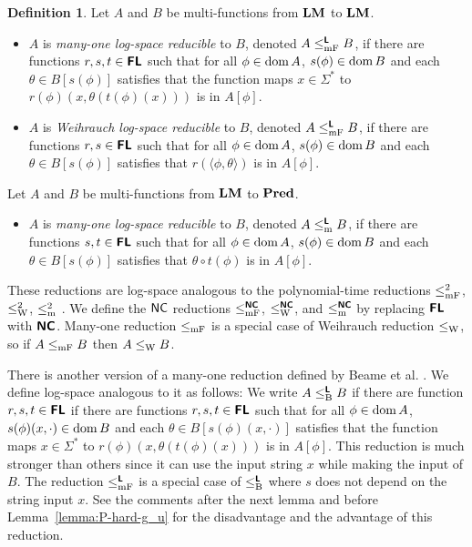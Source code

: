 \documentclass{article}
\theoremstyle{definition}
\newtheorem{definition}[theorem]{Definition}
\theoremstyle{remark}
\begin{document}
\begin{definition}
Let $A$ and $B$ be multi-functions from $\mathbf{LM}$ to $\mathbf{LM}$.
\begin{itemize}
 \item $A$ is \emph{many-one log-space reducible} to $B$, 
       denoted $A \leq _{\mathrm{mF}} ^{\text{\bfseries \sffamily \upshape L}} B$,
       if there are functions $r, s, t \in \text{\bfseries \sffamily \upshape FL}$ such that 
       for all $\phi \in \mathop{\rm dom} A$,
       $s(\phi) \in \mathop{\rm dom} B$ and each $\theta \in B[s(\phi)]$ satisfies that
       the function maps $x \in \Sigma^*$ to $r(\phi)(x, \theta(t(\phi)(x)))$
       is in $A[\phi]$.
 \item $A$ is \emph{Weihrauch log-space reducible} to $B$,
       denoted $A \leq _{\mathrm{mF}} ^{\text{\bfseries \sffamily \upshape L}} B$,
       if there are functions $r, s \in \text{\bfseries \sffamily \upshape FL}$ such that 
       for all $\phi \in \mathop{\rm dom} A$,
       $s(\phi) \in \mathop{\rm dom} B$ and each $\theta \in B[s(\phi)]$ satisfies that
       $r(\langle \phi, \theta \rangle)$ is in $A[\phi]$.
\end{itemize}
Let $A$ and $B$ be multi-functions from $\mathbf{LM}$ to $\mathbf{Pred}$.
\begin{itemize}
 \item $A$ is \emph{many-one log-space reducible} to $B$, denoted 
       $A \leq _{\mathrm{m}} ^{\text{\bfseries \sffamily \upshape L}} B$, if there are functions $s, t \in \text{\bfseries \sffamily \upshape FL}$ such that 
       for all $\phi \in \mathop{\rm dom} A$, $s(\phi) \in \mathop{\rm dom} B$ and each 
       $\theta \in B[s(\phi)]$ satisfies that $\theta \circ t(\phi)$ is in $A[\phi]$.
\end{itemize} 
\end{definition}

These reductions are log-space analogous to the polynomial-time reductions 
$\leq _{\mathrm{mF}}^2$, $\leq _{\mathrm W}^2$, $\leq _{\mathrm{m}}^2$ \cite{kawamura2012complexity}.
We define the $\mathsf{NC}$ reductions $\leq _{\mathrm{mF}}^{\text{\bfseries \sffamily \upshape NC}}$, $\leq _{\mathrm W}^{\text{\bfseries \sffamily \upshape NC}}$,
and $\leq _{\mathrm{m}}^{\text{\bfseries \sffamily \upshape NC}}$ by replacing $\text{\bfseries \sffamily \upshape FL}$ with $\text{\bfseries \sffamily \upshape NC}$.
Many-one reduction $\leq _{\mathrm{mF}}$ is a special case of Weihrauch reduction $\leq _{\mathrm W}$,
so if $A \leq _{\mathrm{mF}} B$ then $A \leq _{\mathrm W} B$.

There is another version of a many-one reduction defined by
Beame et al. \cite{beame1995relative}.
We define log-space analogous to it as follows:
We write $A \leq _{\mathrm B} ^{\text{\bfseries \sffamily \upshape L}} B$ if there are function $r, s, t \in \text{\bfseries \sffamily \upshape FL}$
if there are functions $r, s, t \in \text{\bfseries \sffamily \upshape FL}$ such that 
for all $\phi \in \mathop{\rm dom} A$,
$s(\phi)(x, \cdot) \in \mathop{\rm dom} B$ and each $\theta \in B[s(\phi)(x, \cdot)]$ 
satisfies that the function maps $x \in \Sigma^*$ 
to $r(\phi)(x, \theta(t(\phi)(x)))$ is in $A[\phi]$.
This reduction is much stronger than others since
it can use the input string $x$ while making the input of $B$.
The reduction $\leq _{\mathrm{mF}} ^{\text{\bfseries \sffamily \upshape L}}$ is a special case of $\leq _{\mathrm B} ^{\text{\bfseries \sffamily \upshape L}}$ where
$s$ does not depend on the string input $x$.
See the comments after the next lemma and before Lemma~\ref{lemma:P-hard-g_u} for
the disadvantage and the advantage of this reduction.
\end{document}
